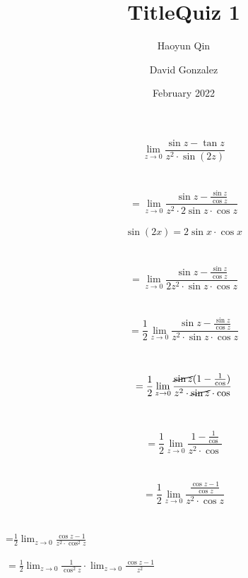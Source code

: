 \documentclass{article}
\title{Title}
\author{Haoyun Qin}
\title{Quiz 1}
\author{David Gonzalez}
\date{February 2022}
\theoremstyle{mytheoremstyle}
\theoremstyle{mytheoremstyle}
\theoremstyle{myproblemstyle}
\begin{document}
\maketitle
\medium

    
\begin{equation}
\lim_{z\to 0} \frac{\sin z-\tan z}{z^2\cdot \sin (2z)}\end{equation}\\
\\
\begin{equation}
=\lim_{z\to 0} \frac{\sin z-\frac{\sin z}{\cos z}}{z^2\cdot 2\sin z \cdot \cos z}\end{equation} \\
\begin{equation}
    \sin (2x) = 2 \sin x \cdot \cos x
\end{equation}
\\
\\
\begin{equation}
=\lim_{z\to 0} \frac{\sin z-\frac{\sin z}{\cos z}}{2z^2\cdot \sin z \cdot \cos z}\end{equation}\\
\\
\begin{equation}
=\frac{1}{2}\lim_{z\to 0} \frac{\sin z-\frac{\sin z}{\cos z}}{z^2\cdot \sin z \cdot \cos z}\end{equation}\\
\\
\begin{equation}
=\frac{1}{2}\lim_{z\to 0} \frac{\cancel{\sin z}(1-\frac{1}{\cos})}{z^2\cdot \cancel{\sin z} \cdot \cos}\end{equation}\\
\\
\begin{equation}
=\frac{1}{2}\lim_{z\to 0} \frac{1-\frac{1}{\cos}}{z^2\cdot \cos}\end{equation}\\
\\
\begin{equation}
=\frac{1}{2}\lim_{z\to 0} \frac{\frac{\cos z -1}{\cos z}}{z^2\cdot\cos z}
\end{equation}
\\
\\

=$\frac{1}{2}\lim_{z\to 0} \frac{\cos z -1}{z^2 \cdot \cos ^2 z}$\\
\\

$=  \frac{1}{2}\lim_{z\to 0} \frac{1}{\cos ^2 z}\cdot \lim_{z\to 0} \frac{\cos z -1}{z^2}$\\
\\
\end{document}
